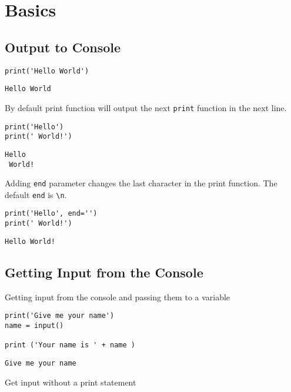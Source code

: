 \documentclass[11pt]{article}
\author{James Paul M. Pandan}
\date{\today}
\title{}
\begin{document}
\setcounter{tocdepth}{4}
\tableofcontents


\section{Basics}
\label{sec:orgc64f03b}
\subsection{Output to Console}
\label{sec:org6a96085}
\begin{verbatim}
print('Hello World')
\end{verbatim}

\begin{verbatim}
Hello World
\end{verbatim}


By default print function will output the next \texttt{print} function in the next line.
\begin{verbatim}
print('Hello')
print(' World!')
\end{verbatim}

\begin{verbatim}
Hello
 World!
\end{verbatim}



Adding \texttt{end} parameter changes the last character in the print function.
The default \texttt{end} is \texttt{\textbackslash{}n}.
\begin{verbatim}
print('Hello', end='')
print(' World!')
\end{verbatim}

\begin{verbatim}
Hello World!
\end{verbatim}

\subsection{Getting Input from the Console}
\label{sec:orgd521cae}
Getting input from the console and passing them to a variable
\begin{verbatim}
print('Give me your name')
name = input()

print ('Your name is ' + name )
\end{verbatim}

\begin{verbatim}
Give me your name
\end{verbatim}

Get input without a print statement
\end{document}
